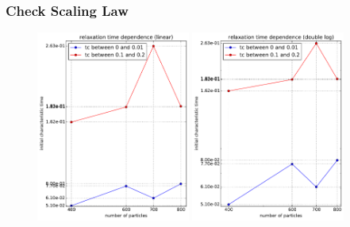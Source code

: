 \documentclass[slidestop, compress, mathserif]{beamer}
\begin{document}
\begin{frame}
  \frametitle<presentation>{Check Scaling Law}
  \begin{figure}
    \centering
    \includegraphics[width=0.45\textwidth]{../relaxation_time_dependence_wrt_concentration.pdf}
    \includegraphics[width=0.45\textwidth]{../relaxation_time_dependence_wrt_concentration_loglog.pdf}
  \end{figure}
\end{frame}


\end{document}

